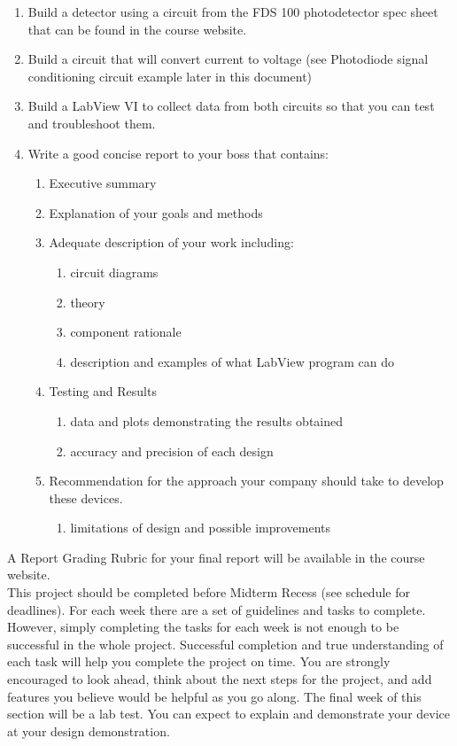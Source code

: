 \documentclass{article}
\begin{document}
\begin{enumerate}
	\item Build a detector using a circuit from the FDS 100 photodetector spec sheet that can be found in the course website.
	\item Build a circuit that will convert current to voltage (see Photodiode signal conditioning circuit example later in this document)
	\item Build a LabView VI to collect data from both circuits so that you can test and troubleshoot them.
	\item Write a good concise report to your boss that contains:
	\begin{enumerate}
		\item Executive summary
		\item Explanation of your goals and methods
		\item Adequate description of your work including:
		\begin{enumerate}
			\item circuit diagrams
			\item theory
			\item component rationale
			\item description and examples of what LabView program can do
		\end{enumerate}
		\item Testing and Results
		\begin{enumerate}
			\item data and plots demonstrating the results obtained
			\item accuracy and precision of each design
		\end{enumerate}
		\item Recommendation for the approach your company should take to develop these devices.
		\begin{enumerate}
			\item limitations of design and possible improvements
		\end{enumerate}
	\end{enumerate}
\end{enumerate}

A Report Grading Rubric for your final report will be available in the course website.\\

This project should be completed before Midterm Recess (see schedule for deadlines). For each week there are a set of guidelines and tasks to complete. However, simply completing the tasks for each week is not enough to be successful in the whole project. Successful completion and true understanding of each task will help you complete the project on time. You are strongly encouraged to look ahead, think about the next steps for the project, and add features you believe would be helpful as you go along. The final week of this section will be a lab test. You can expect to explain and demonstrate your device at your design demonstration.
\end{document}
